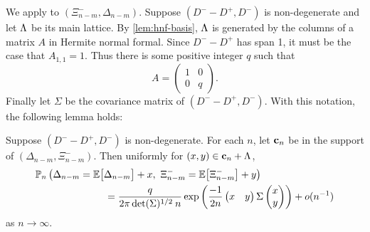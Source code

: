 We apply  to $(\Xi_{n-m}^-, \Delta_{n-m})$. Suppose $(D^- - D^+, D^-)$ is non-degenerate and let $\Lambda$ be its main lattice. By \cref{lem:hnf-basis}, $\Lambda$ is generated by the columns of a matrix $A$ in Hermite normal formal. Since $D^- - D^+$ has span 1, it must be the case that $A_{1, 1} = 1$. Thus there is some positive integer $q$ such that
\begin{equation*}
    A = \begin{pmatrix}
        1 & 0 \\ 
        0 & q
    \end{pmatrix}.
\end{equation*}
Finally let $\Sigma$ be the covariance matrix of $(D^- - D^+, D^-)$. With this notation, the following lemma holds:
\begin{lemma}
    \label{lem:bivar-llt}
    Suppose $(D^- - D^+, D^-)$ is non-degenerate. For each $n$, let ${\mathbf c}_n$ be in the support of $(\Delta_{n-m}, \Xi^-_{n-m})$. Then uniformly for $(x, y) \in {\mathbf c}_n + \Lambda$,
    \begin{align*}
        &\P_n\left(
            \Delta_{n-m} = \E \big[ \Delta_{n-m} \big] + x, \ 
            \Xi^-_{n-m} = \E \big[ \Xi^-_{n-m} \big] + y
        \right)  \nonumber \\
        &\hspace{7em} = \frac{q}{2\pi \det(\Sigma)^{1/2} \: n} \exp\left( 
            \frac{-1}{2n}
            \begin{pmatrix}
                x & y
            \end{pmatrix}
            \Sigma
            \begin{pmatrix}
                x \\ y
            \end{pmatrix}
        \right)
        + \littleo( n^{-1} )
    \end{align*}
    as $n \to \infty$.
\end{lemma}
